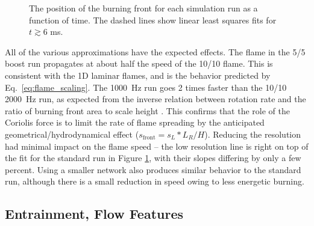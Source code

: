 \documentclass[trackchanges,preprint,times,tighten]{aastex63}
\begin{document}
\begin{figure}[t]
\centering
{}
\caption{\label{fig:flame_speed}The position of the burning front for each simulation run as a function of time. The dashed lines show linear least squares fits for $t \gtrsim 6$ ms. }
\end{figure}

All of the various approximations have the expected effects. The flame in the 5/5
boost run propagates at about half the speed of the 10/10 flame. This is consistent
with the 1D laminar flames, and is the behavior predicted by Eq.~\ref{eq:flame_scaling}. The
1000~Hz run goes  2 times faster than the 10/10 2000~Hz run, as expected from the
inverse relation between rotation rate and the ratio of burning front area to scale height
.
This confirms that the role of the Coriolis
force is to limit the rate of flame spreading by the anticipated geometrical/hydrodynamical
effect ($s_\mathrm{front} = s_L * L_R / H$). Reducing the resolution
had minimal impact on the flame speed -- the low resolution line is right on top of the fit for the
standard run in Figure \ref{fig:flame_speed}, with their slopes differing by only a few percent. Using a
smaller network also produces similar behavior to the standard run, although there is a small
reduction in speed owing to less energetic burning.



\subsection{Entrainment, Flow Features}
\end{document}
